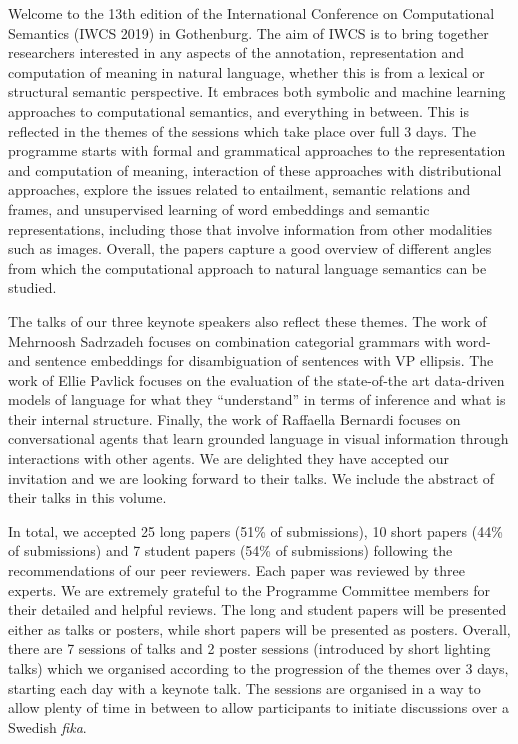 \documentclass[a4paper,11pt,oneside]{book}
\begin{document}
Welcome to the 13th edition of the International Conference on
Computational Semantics (IWCS 2019) in Gothenburg.  The aim of IWCS is
to bring together researchers interested in any aspects of the
annotation, representation and computation of meaning in natural
language, whether this is from a lexical or structural semantic
perspective. It embraces both symbolic and machine learning approaches
to computational semantics, and everything in between. This is
reflected in the themes of the sessions which take place over full 3
days. The programme starts with formal and grammatical approaches to
the representation and computation of meaning, interaction of these
approaches with distributional approaches, explore the issues related
to entailment, semantic relations and frames, and unsupervised
learning of word embeddings and semantic representations, including
those that involve information from other modalities such as
images. Overall, the papers capture a good overview of different
angles from which the computational approach to natural language
semantics can be studied.

The talks of our three keynote speakers also reflect these themes. The
work of Mehrnoosh Sadrzadeh focuses on combination categorial grammars
with word- and sentence embeddings for disambiguation of sentences
with VP ellipsis. The work of Ellie Pavlick focuses on the evaluation
of the state-of-the art data-driven models of language for what they
``understand'' in terms of inference and what is their internal
structure. Finally, the work of Raffaella Bernardi focuses on
conversational agents that learn grounded language in visual
information through interactions with other agents. We are delighted
they have accepted our invitation and we are looking forward to their
talks. We include the abstract of their talks in this volume.

In total, we accepted 25 long papers (51\% of submissions), 10 short
papers (44\% of submissions) and 7 student papers (54\% of
submissions) following the recommendations of our peer reviewers. Each
paper was reviewed by three experts. We are extremely grateful to the
Programme Committee members for their detailed and helpful
reviews. The long and student papers will be presented either as talks
or posters, while short papers will be presented as posters. Overall,
there are 7 sessions of talks and 2 poster sessions (introduced by
short lighting talks) which we organised according to the progression
of the themes over 3 days, starting each day with a keynote talk. The
sessions are organised in a way to allow plenty of time in between to
allow participants to initiate discussions over a Swedish \emph{fika}.
\end{document}
